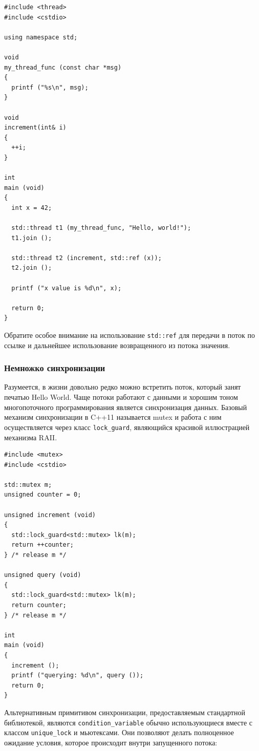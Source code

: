 \documentclass[a4paper,12pt,oneside]{article}
\begin{document}
\begin{lstlisting}
#include <thread>
#include <cstdio>

using namespace std;

void 
my_thread_func (const char *msg)
{
  printf ("%s\n", msg);
}

void 
increment(int& i)
{
  ++i;
}

int 
main (void)
{
  int x = 42;

  std::thread t1 (my_thread_func, "Hello, world!");
  t1.join ();

  std::thread t2 (increment, std::ref (x));
  t2.join ();

  printf ("x value is %d\n", x);

  return 0;
}
\end{lstlisting}

Обратите особое внимание на использование \lstinline!std::ref! для передачи в поток по ссылке и дальнейшее использование возвращенного из потока значения.

\subsubsection{Немножко синхронизации}

Разумеется, в жизни довольно редко можно встретить поток, который занят печатью Hello World. Чаще потоки работают с данными и хорошим тоном многопоточного программирования является синхронизация данных. Базовый механизм синхронизации в C++11 называется mutex и работа с ним осуществляется через класс \lstinline!lock_guard!, являющийся красивой иллюстрацией механизма RAII.

\begin{lstlisting}
#include <mutex>
#include <cstdio>

std::mutex m;
unsigned counter = 0;

unsigned increment (void)
{
  std::lock_guard<std::mutex> lk(m);
  return ++counter;
} /* release m */

unsigned query (void)
{
  std::lock_guard<std::mutex> lk(m);
  return counter;
} /* release m */

int
main (void)
{
  increment ();
  printf ("querying: %d\n", query ());
  return 0;
}
\end{lstlisting}

Альтернативным примитивом синхронизации, предоставляемым стандартной библиотекой, являются \lstinline!condition_variable! обычно использующиеся вместе с классом \lstinline!unique_lock! и мьютексами. Они позволяют делать полноценное ожидание условия, которое происходит внутри запущенного потока:
\end{document}

